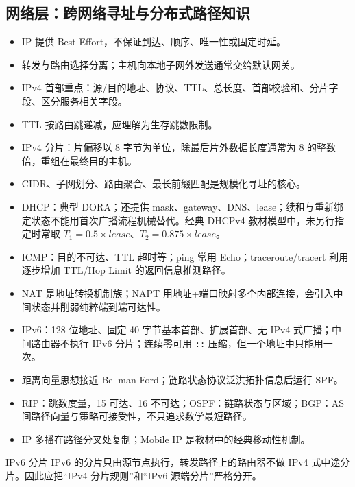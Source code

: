 \documentclass[11pt,a4paper,openany]{ctexbook}
\begin{document}
\subsection{网络层：跨网络寻址与分布式路径知识}
\begin{itemize}
  \item IP 提供 Best-Effort，不保证到达、顺序、唯一性或固定时延。
  \item 转发与路由选择分离；主机向本地子网外发送通常交给默认网关。
  \item IPv4 首部重点：源/目的地址、协议、TTL、总长度、首部校验和、分片字段、区分服务相关字段。
  \item TTL 按路由跳递减，应理解为生存跳数限制。
  \item IPv4 分片：片偏移以 8 字节为单位，除最后片外数据长度通常为 8 的整数倍，重组在最终目的主机。
  \item CIDR、子网划分、路由聚合、最长前缀匹配是规模化寻址的核心。
  \item DHCP：典型 DORA；还提供 mask、gateway、DNS、lease；续租与重新绑定状态不能用首次广播流程机械替代。经典 DHCPv4 教材模型中，未另行指定时常取 $T_1=0.5\times lease$、$T_2=0.875\times lease$。
  \item ICMP：目的不可达、TTL 超时等；ping 常用 Echo；traceroute/tracert 利用逐步增加 TTL/Hop Limit 的返回信息推测路径。
  \item NAT 是地址转换机制族；NAPT 用地址+端口映射多个内部连接，会引入中间状态并削弱纯粹端到端可达性。
  \item IPv6：128 位地址、固定 40 字节基本首部、扩展首部、无 IPv4 式广播；中间路由器不执行 IPv6 分片；连续零可用 \texttt{::} 压缩，但一个地址中只能用一次。
  \item 距离向量思想接近 Bellman-Ford；链路状态协议泛洪拓扑信息后运行 SPF。
  \item RIP：跳数度量，15 可达、16 不可达；OSPF：链路状态与区域；BGP：AS 间路径向量与策略可接受性，不只追求数学最短路径。
  \item IP 多播在路径分叉处复制；Mobile IP 是教材中的经典移动性机制。
\end{itemize}

\begin{modernbox}{IPv6 分片}
IPv6 的分片只由源节点执行，转发路径上的路由器不做 IPv4 式中途分片。因此应把“IPv4 分片规则”和“IPv6 源端分片”严格分开。
\end{modernbox}
\end{document}
